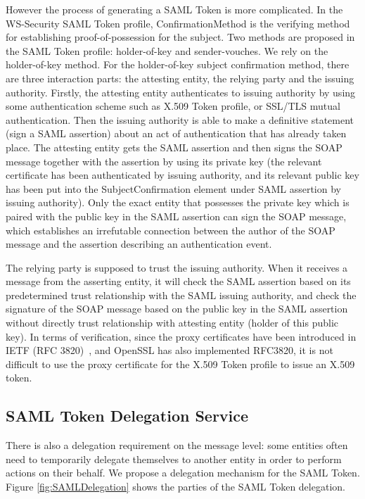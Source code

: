 \documentclass[twocolumn]{svjour3}         %
\begin{document}
However the process of generating a SAML Token is more complicated. In the WS-Security SAML Token profile, ConfirmationMethod is the verifying method for establishing proof-of-possession for the subject. Two methods are proposed in the SAML Token profile: holder-of-key and sender-vouches. We rely on the holder-of-key method. For the holder-of-key subject confirmation method, there are three interaction parts: the attesting entity, the relying party and the issuing authority. Firstly, the attesting entity authenticates to issuing authority by using some authentication scheme such as X.509 Token profile, or SSL/TLS mutual authentication. Then the issuing authority is able to make a definitive statement (sign a SAML assertion) about an act of authentication that has already taken place. The attesting entity gets the SAML assertion and then signs the SOAP message together with the assertion by using its private key (the relevant certificate has been authenticated by issuing authority, and its relevant public key has been put into the SubjectConfirmation element under SAML assertion by issuing authority). Only the exact entity that possesses the private key which is paired with the public key in the SAML assertion can sign the SOAP message, which establishes an irrefutable connection between the author of the SOAP message and the assertion describing an authentication event.

The relying party is supposed to trust the issuing authority. When it receives a message from the asserting entity, it will check the SAML assertion based on its predetermined trust relationship with the SAML issuing authority, and check the signature of the SOAP message based on the public key in the SAML assertion without directly trust relationship with attesting entity (holder of this public key).
In terms of verification, since the proxy certificates have been introduced in IETF (RFC 3820)~\cite{RFC3820link}, and OpenSSL has also implemented RFC3820, it is not difficult to use the proxy certificate for the X.509 Token profile to issue an X.509 token.

\subsection{SAML Token Delegation Service}
\label{sec:samldeleg}
There is also a delegation requirement on the message level: some entities often need to temporarily delegate themselves to another entity in order to perform actions on their behalf. We propose a delegation mechanism for the SAML Token. Figure \ref{fig:SAMLDelegation} shows the parties of the SAML Token delegation.
\end{document}
